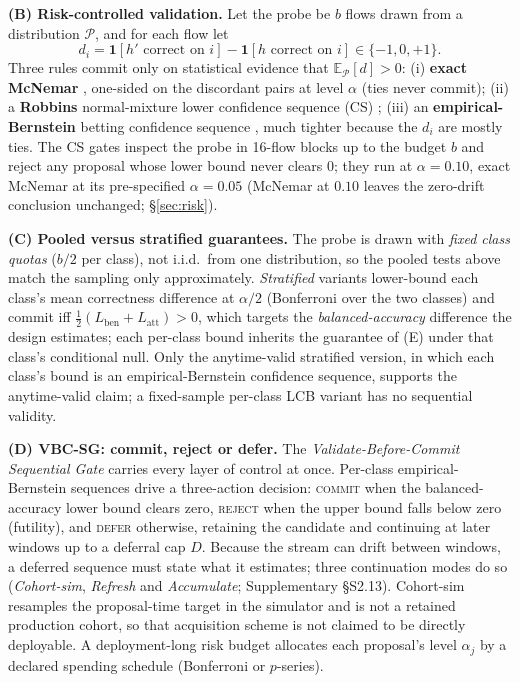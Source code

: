\documentclass[a4paper,fleqn]{cas-sc}
\begin{document}
\textbf{(B) Risk-controlled validation.} Let the probe be $b$ flows drawn from a distribution $\mathcal P$, and for each flow let
$$d_i = \mathbf 1[h'\text{ correct on }i] - \mathbf 1[h\text{ correct on }i]\in\{-1,0,+1\}.$$
Three rules commit only on statistical evidence that $\mathbb E_{\mathcal P}[d]>0$: (i) \textbf{exact McNemar} \cite{mcnemar1947note}, one-sided on the discordant pairs at level $\alpha$ (ties never commit); (ii) a \textbf{Robbins} normal-mixture lower confidence sequence (CS) \cite{howard2021timeuniform}; (iii) an \textbf{empirical-Bernstein} betting confidence sequence \cite{waudbysmith2023betting}, much tighter because the $d_i$ are mostly ties. The CS gates inspect the probe in 16-flow blocks up to the budget $b$ and reject any proposal whose lower bound never clears $0$; they run at $\alpha=0.10$, exact McNemar at its pre-specified $\alpha=0.05$ (McNemar at $0.10$ leaves the zero-drift conclusion unchanged; \S\ref{sec:risk}).

\textbf{(C) Pooled versus stratified guarantees.} The probe is drawn with \emph{fixed class quotas} ($b/2$ per class), not i.i.d.\ from one distribution, so the pooled tests above match the sampling only approximately. \emph{Stratified} variants lower-bound each class's mean correctness difference at $\alpha/2$ (Bonferroni over the two classes) and commit iff $\tfrac12(L_{\mathrm{ben}}+L_{\mathrm{att}})>0$, which targets the \emph{balanced-accuracy} difference the design estimates; each per-class bound inherits the guarantee of (E) under that class's conditional null. Only the anytime-valid stratified version, in which each class's bound is an empirical-Bernstein confidence sequence, supports the anytime-valid claim; a fixed-sample per-class LCB variant has no sequential validity.

\textbf{(D) VBC-SG: commit, reject or defer.} The \emph{Validate-Before-Commit Sequential Gate} carries every layer of control at once. Per-class empirical-Bernstein sequences drive a three-action decision: \textsc{commit} when the balanced-accuracy lower bound clears zero, \textsc{reject} when the upper bound falls below zero (futility), and \textsc{defer} otherwise, retaining the candidate and continuing at later windows up to a deferral cap $D$. Because the stream can drift between windows, a deferred sequence must state what it estimates; three continuation modes do so (\emph{Cohort-sim}, \emph{Refresh} and \emph{Accumulate}; Supplementary \S S2.13). Cohort-sim resamples the proposal-time target in the simulator and is not a retained production cohort, so that acquisition scheme is not claimed to be directly deployable. A deployment-long risk budget allocates each proposal's level $\alpha_j$ by a declared spending schedule (Bonferroni or $p$-series).
\end{document}
